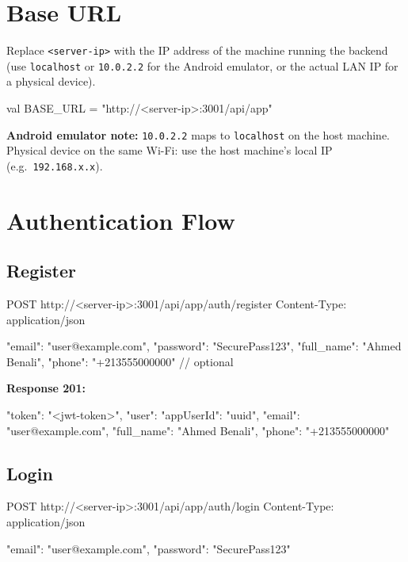 \documentclass[12pt,a4paper]{report}
\begin{document}
\section{Base URL}

Replace \texttt{<server-ip>} with the IP address of the machine running the backend
(use \texttt{localhost} or \texttt{10.0.2.2} for the Android emulator, or the actual
LAN IP for a physical device).

\begin{codebox}
val BASE_URL = "http://<server-ip>:3001/api/app"
\end{codebox}

\begin{tcolorbox}[colback=orangebg, colframe=orangefg!40, arc=4pt]
  \textbf{Android emulator note:} \texttt{10.0.2.2} maps to \texttt{localhost} on the host machine.
  Physical device on the same Wi-Fi: use the host machine's local IP (e.g.\ \texttt{192.168.x.x}).
\end{tcolorbox}

\section{Authentication Flow}

\subsection{Register}

\begin{codebox}
POST http://<server-ip>:3001/api/app/auth/register
Content-Type: application/json

{
  "email":     "user@example.com",
  "password":  "SecurePass123",
  "full_name": "Ahmed Benali",
  "phone":     "+213555000000"   // optional
}
\end{codebox}

\textbf{Response 201:}
\begin{codebox}
{
  "token": "<jwt-token>",
  "user": {
    "appUserId": "uuid",
    "email":     "user@example.com",
    "full_name": "Ahmed Benali",
    "phone":     "+213555000000"
  }
}
\end{codebox}

\subsection{Login}

\begin{codebox}
POST http://<server-ip>:3001/api/app/auth/login
Content-Type: application/json

{
  "email":    "user@example.com",
  "password": "SecurePass123"
}
\end{codebox}
\end{document}
